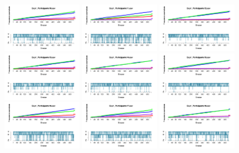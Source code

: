 \begin{figure}[th]
\includegraphics[width=0.30\textwidth]{Figures/Outcome_Exp1_P10} \includegraphics[width=0.30\textwidth]{Figures/Outcome_Exp1_P11} \includegraphics[width=0.30\textwidth]{Figures/Outcome_Exp1_P12}
\includegraphics[width=0.30\textwidth]{Figures/Outcome_Exp1_P13} \includegraphics[width=0.30\textwidth]{Figures/Outcome_Exp1_P14} \includegraphics[width=0.30\textwidth]{Figures/Outcome_Exp1_P15}
\includegraphics[width=0.30\textwidth]{Figures/Outcome_Exp1_P16} \includegraphics[width=0.30\textwidth]{Figures/Outcome_Exp1_P17} \includegraphics[width=0.30\textwidth]{Figures/Outcome_Exp1_P18}

\end{figure}
